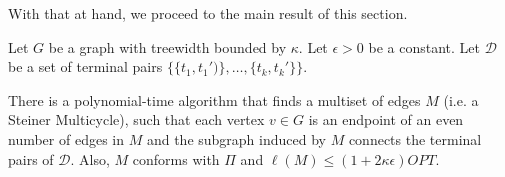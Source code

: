 With that at hand, we proceed to the main result of this section.

\begin{theorem}\label{dynamicProgramming}

Let \(G\) be a graph with treewidth bounded by \(\kappa\). Let \(\epsilon > 0\) be a constant. Let \(\mathcal{D}\) be a set of terminal pairs \(\{\{t_1, t_1')\}, \dots, \{t_k, t_k'\}\}\).

There is a polynomial-time algorithm that finds a multiset of edges \(M\) (i.e. a Steiner Multicycle), such that each vertex \(v \in G\) is an endpoint of an even number of edges in \(M\) and the subgraph induced by \(M\) connects the terminal pairs of \(\mathcal{D}\). Also, \(M\) conforms with \(\Pi\) and \(\ell(M) \leq (1 + 2 \kappa \epsilon) OPT\).

\end{theorem}
